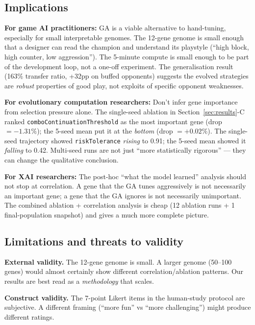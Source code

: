 \documentclass[conference]{IEEEtran}
\begin{document}
\subsection{Implications}

\textbf{For game AI practitioners:} GA is a viable alternative to hand-tuning, especially for small interpretable genomes. The 12-gene genome is small enough that a designer can read the champion and understand its playstyle (``high block, high counter, low aggression''). The 5-minute compute is small enough to be part of the development loop, not a one-off experiment. The generalisation result (163\% transfer ratio, +32pp on buffed opponents) suggests the evolved strategies are \emph{robust} properties of good play, not exploits of specific opponent weaknesses.

\textbf{For evolutionary computation researchers:} Don't infer gene importance from selection pressure alone. The single-seed ablation in Section~\ref{sec:results}-C ranked \texttt{comboContinuationThreshold} as the most important gene (drop $= -1.31\%$); the 5-seed mean put it at the \emph{bottom} (drop $= +0.02\%$). The single-seed trajectory showed \texttt{riskTolerance} \emph{rising} to 0.91; the 5-seed mean showed it \emph{falling} to 0.42. Multi-seed runs are not just ``more statistically rigorous'' --- they can change the qualitative conclusion.

\textbf{For XAI researchers:} The post-hoc ``what the model learned'' analysis should not stop at correlation. A gene that the GA tunes aggressively is not necessarily an important gene; a gene that the GA ignores is not necessarily unimportant. The combined ablation + correlation analysis is cheap (12 ablation runs + 1 final-population snapshot) and gives a much more complete picture.

\subsection{Limitations and threats to validity}

\textbf{External validity.} The 12-gene genome is small. A larger genome (50--100 genes) would almost certainly show different correlation/ablation patterns. Our results are best read as a \emph{methodology} that scales.

\textbf{Construct validity.} The 7-point Likert items in the human-study protocol are subjective. A different framing (``more fun'' vs ``more challenging'') might produce different ratings.
\end{document}
